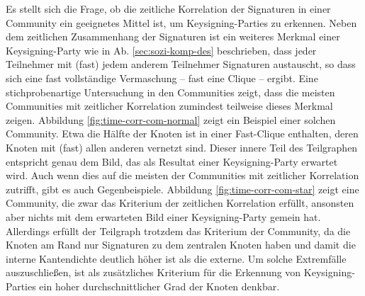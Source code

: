 Es stellt sich die Frage, ob die zeitliche Korrelation der Signaturen
in einer Community ein geeignetes Mittel ist, um Keysigning-Parties zu
erkennen. Neben dem zeitlichen Zusammenhang der Signaturen ist ein
weiteres Merkmal einer Keysigning-Party wie in
Ab. \ref{sec:sozi-komp-des} beschrieben, dass jeder Teilnehmer mit
(fast) jedem anderem Teilnehmer Signaturen austauscht, so dass sich
eine fast vollständige Vermaschung -- fast eine Clique --
ergibt. Eine stichprobenartige Untersuchung in den Communities zeigt,
dass die meisten Communities mit zeitlicher Korrelation zumindest
teilweise dieses Merkmal zeigen. Abbildung
\ref{fig:time-corr-com-normal} zeigt ein Beispiel einer solchen
Community. Etwa die Hälfte der Knoten ist in einer Fast-Clique
enthalten, deren Knoten mit (fast) allen anderen vernetzt sind. Dieser
innere Teil des Teilgraphen entspricht genau dem Bild, das als
Resultat einer Keysigning-Party erwartet wird. Auch wenn dies auf die
meisten der Communities mit zeitlicher Korrelation zutrifft, gibt es
auch Gegenbeispiele. Abbildung \ref{fig:time-corr-com-star} zeigt eine
Community, die zwar das Kriterium der zeitlichen Korrelation
erfüllt, ansonsten aber nichts mit dem erwarteten Bild einer
Keysigning-Party gemein hat. Allerdings erfüllt der Teilgraph
trotzdem das Kriterium der Community, da die Knoten am Rand nur
Signaturen zu dem zentralen Knoten haben und damit die interne
Kantendichte deutlich höher ist als die externe. Um solche
Extremfälle auszuschließen, ist als zusätzliches Kriterium für
die Erkennung von Keysigning-Parties ein hoher durchschnittlicher Grad
der Knoten denkbar.

